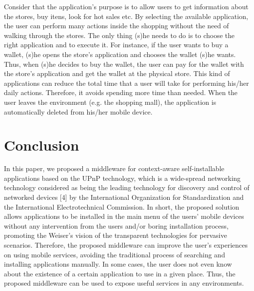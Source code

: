 \documentclass[journal]{IEEEtran}
\begin{document}
Consider that the application's purpose is to allow users to get information about the stores, buy itens, look for hot sales etc. By selecting the available application, the user can perform many actions inside the shopping without the need of walking through the stores. The only thing (s)he needs to do is to choose the right application and to execute it. For instance, if the user wants to buy a wallet, (s)he opens the store's  application and chooses the wallet (s)he wants. Thus, when (s)he decides to buy the wallet, the user can pay for the wallet with the store's application and get the wallet at the physical store. This kind of applications can reduce the total time that a user will take for performing his/her daily actions. Therefore, it avoids spending more time than needed. When the user leaves the environment (e.g. the shopping mall), the application is automatically deleted from his/her mobile device.

\section{Conclusion}
In this paper, we proposed a middleware for context-aware self-installable applications based on the UPnP technology, which is a wide-spread networking technology considered as being the leading technology for discovery and control of networked devices [4] by the International Organization for Standardization and the International Electrotechnical Commission. In short, the proposed solution allows applications to be  installed in the main menu of the users' mobile devices without any intervention from the users and/or boring installation process, promoting the Weiser's vision of the transparent technologies for pervasive scenarios. Therefore, the proposed middleware can improve the user's experiences on using mobile services, avoiding the traditional process of searching and installing applications manually. In some cases, the user does not even know about the existence of a certain application to use in a given place. Thus, the proposed middleware can be used to expose useful services in any environments.

\ifCLASSOPTIONcaptionsoff
  \newpage
\fi 
\end{document}
